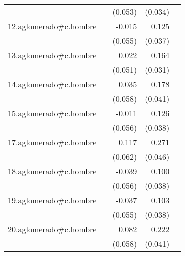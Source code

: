{\begin{longtable}{l*{4}{D{.}{.}{-1}}}
            &                     &     (0.053)         &     (0.034)         &                     \\
\addlinespace
12.aglomerado#c.hombre&                     &      -0.015         &       0.125\sym{***}&                     \\
            &                     &     (0.055)         &     (0.037)         &                     \\
\addlinespace
13.aglomerado#c.hombre&                     &       0.022         &       0.164\sym{***}&                     \\
            &                     &     (0.051)         &     (0.031)         &                     \\
\addlinespace
14.aglomerado#c.hombre&                     &       0.035         &       0.178\sym{***}&                     \\
            &                     &     (0.058)         &     (0.041)         &                     \\
\addlinespace
15.aglomerado#c.hombre&                     &      -0.011         &       0.126\sym{**} &                     \\
            &                     &     (0.056)         &     (0.038)         &                     \\
\addlinespace
17.aglomerado#c.hombre&                     &       0.117         &       0.271\sym{***}&                     \\
            &                     &     (0.062)         &     (0.046)         &                     \\
\addlinespace
18.aglomerado#c.hombre&                     &      -0.039         &       0.100\sym{**} &                     \\
            &                     &     (0.056)         &     (0.038)         &                     \\
\addlinespace
19.aglomerado#c.hombre&                     &      -0.037         &       0.103\sym{**} &                     \\
            &                     &     (0.055)         &     (0.038)         &                     \\
\addlinespace
20.aglomerado#c.hombre&                     &       0.082         &       0.222\sym{***}&                     \\
            &                     &     (0.058)         &     (0.041)         &                     \\

\end{longtable}}
